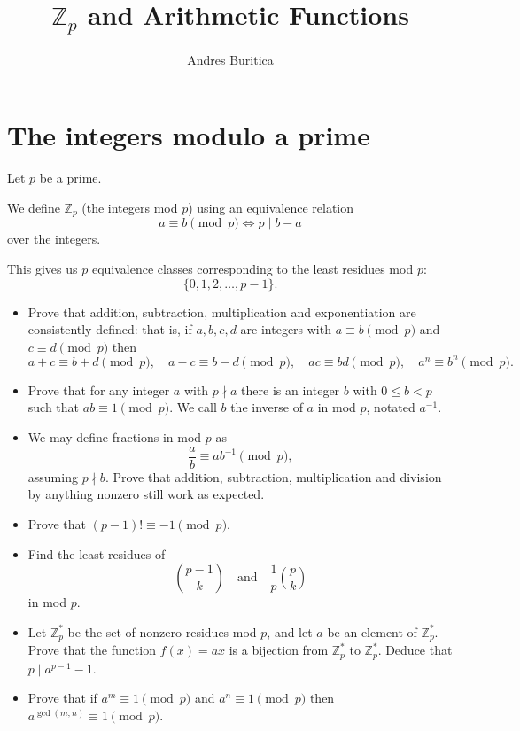 \documentclass{article}
\title{$\mathbb Z_p$ and Arithmetic Functions}
\author{Andres Buritica}
\date{}
\begin{document}
\maketitle
\section{The integers modulo a prime}
  Let $p$ be a prime.

  We define $\mathbb Z_p$ (the integers mod $p$) using an equivalence relation
  \[a\equiv b\pmod p\iff p\mid b-a\]
  over the integers.

  This gives us $p$ equivalence classes corresponding to the least residues mod
  $p$: \[\{0,1,2,\ldots,p-1\}.\]
  \begin{itemize}
    \item Prove that addition, subtraction, multiplication and exponentiation
      are consistently defined: that
      is, if $a,b,c,d$ are integers with $a\equiv b\pmod p$ and $c\equiv d\pmod
      p$ then \[a+c\equiv b+d\pmod p,\quad a-c\equiv b-d\pmod p,\quad ac\equiv
        bd\pmod p,\quad a^n\equiv b^n\pmod p.\]
    \item Prove that for any integer $a$ with $p\nmid a$ there is an integer $b$
      with $0\le b<p$ such that $ab\equiv 1\pmod p$. We call $b$ the inverse of
      $a$ in mod $p$, notated $a^{-1}$.
    \item We may define fractions in mod $p$ as \[\frac ab\equiv ab^{-1}\pmod p,\]
      assuming $p\nmid b$. Prove that addition, subtraction, multiplication
      and division by anything nonzero still work as expected.
    \item Prove that $(p-1)!\equiv -1\pmod p$.
    \item Find the least residues of 
      \[\binom {p-1}k\quad\text{and}\quad\frac1p\binom pk\] in mod $p$.
    \item Let $\mathbb Z_p^*$ be the set of nonzero residues mod $p$, and let $a$ be an
      element of $\mathbb Z_p^*$. Prove that the function $f(x)=ax$ is a
      bijection from $\mathbb Z_p^*$ to $\mathbb Z_p^*$. Deduce that $p\mid
      a^{p-1}-1$.
    \item Prove that if $a^m\equiv 1\pmod p$ and $a^n\equiv 1\pmod p$ then
      $a^{\gcd(m,n)}\equiv 1\pmod p$.
  \end{itemize}
  \newpage
\end{document}
